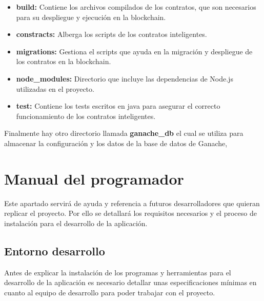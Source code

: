 \begin{itemize}

\item \textbf{build:} Contiene los archivos compilados de los contratos, que son necesarios para su despliegue y ejecución en la blockchain.

\item \textbf{constracts:} Alberga los scripts de los contratos inteligentes.

\item \textbf{migrations:} Gestiona el scripts que ayuda en la migración y despliegue de los contratos en la blockchain.

\item \textbf{node\_modules:} Directorio que incluye las dependencias de Node.js utilizadas en el proyecto.

\item \textbf{test:} Contiene los tests escritos en java para asegurar el correcto funcionamiento de los contratos inteligentes.

\end{itemize}

Finalmente hay otro directorio llamada \textbf{ganache\_db} el cual se utiliza para almacenar la configuración y los datos de la base de datos de Ganache,


\section{Manual del programador}

Este apartado servirá de ayuda y referencia a futuros desarrolladores que quieran replicar el proyecto. 
Por ello se detallará los requisitos necesarios y el proceso de instalación para el desarrollo de la aplicación. 

\subsection{Entorno desarrollo}

Antes de explicar la instalación de los programas y herramientas para el desarrollo de la aplicación es necesario detallar unas especificaciones mínimas en cuanto al equipo de desarrollo para poder trabajar con el proyecto.

